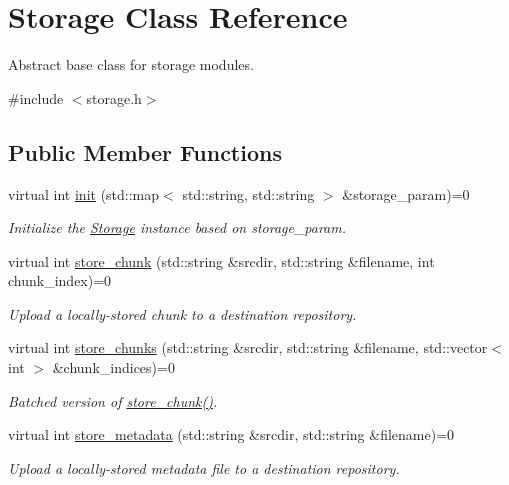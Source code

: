 \hypertarget{classStorage}{\section{\-Storage \-Class \-Reference}
\label{classStorage}
}


\-Abstract base class for storage modules.  




{\ttfamily \#include $<$storage.\-h$>$}

\subsection*{\-Public \-Member \-Functions}
\begin{DoxyCompactItemize}
\item 
virtual int \hyperlink{classStorage_a74753801bdc4df993c5a8feb4eb65918}{init} (std\-::map$<$ std\-::string, std\-::string $>$ \&storage\-\_\-param)=0
\begin{DoxyCompactList}\small\item\em \-Initialize the \hyperlink{classStorage}{\-Storage} instance based on storage\-\_\-param. \end{DoxyCompactList}\item 
virtual int \hyperlink{classStorage_a0fbaf557ce9a2bd4b1b0a00296d8cf66}{store\-\_\-chunk} (std\-::string \&srcdir, std\-::string \&filename, int chunk\-\_\-index)=0
\begin{DoxyCompactList}\small\item\em \-Upload a locally-\/stored chunk to a destination repository. \end{DoxyCompactList}\item 
virtual int \hyperlink{classStorage_a90bad676d3caaca1aa48243c512c7f98}{store\-\_\-chunks} (std\-::string \&srcdir, std\-::string \&filename, std\-::vector$<$ int $>$ \&chunk\-\_\-indices)=0
\begin{DoxyCompactList}\small\item\em \-Batched version of \hyperlink{classStorage_a0fbaf557ce9a2bd4b1b0a00296d8cf66}{store\-\_\-chunk()}. \end{DoxyCompactList}\item 
virtual int \hyperlink{classStorage_a770cc3b02e9cd00176f3766d7f1cef86}{store\-\_\-metadata} (std\-::string \&srcdir, std\-::string \&filename)=0
\begin{DoxyCompactList}\small\item\em \-Upload a locally-\/stored metadata file to a destination repository. \end{DoxyCompactList}\item 

\end{DoxyCompactItemize}
